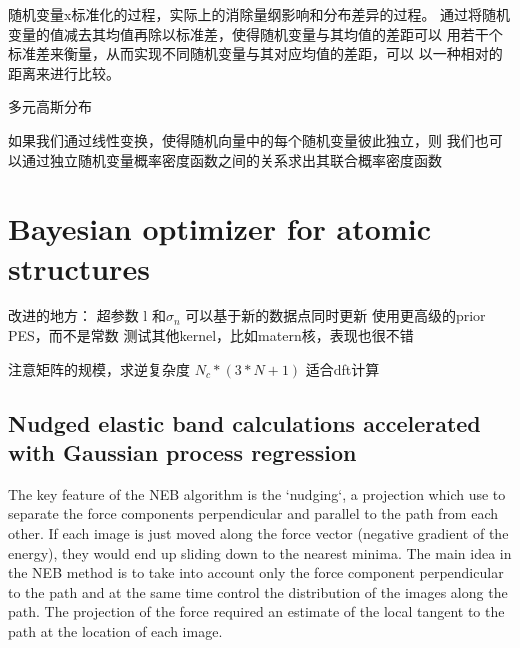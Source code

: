 \documentclass[a4paper, 12pt, CJKnumber, UTF8, openany,nofonts, fancyhdr]{ctexbook}
\begin{document}
 随机变量x标准化的过程，实际上的消除量纲影响和分布差异的过程。
 通过将随机变量的值减去其均值再除以标准差，使得随机变量与其均值的差距可以
 用若干个标准差来衡量，从而实现不同随机变量与其对应均值的差距，可以
 以一种相对的距离来进行比较。

 多元高斯分布

 如果我们通过线性变换，使得随机向量中的每个随机变量彼此独立，则
 我们也可以通过独立随机变量概率密度函数之间的关系求出其联合概率密度函数

 \section{Bayesian optimizer for atomic structures}

 改进的地方：
 超参数 l 和$\sigma_n$ 可以基于新的数据点同时更新
 使用更高级的prior PES，而不是常数
 测试其他kernel，比如matern核，表现也很不错

 注意矩阵的规模，求逆复杂度 $N_c*(3*N+1)$  适合dft计算

 \subsection{Nudged elastic band calculations accelerated with Gaussian
   process regression}

 The key feature of the NEB algorithm is the `nudging`,
 a projection which  use to separate the force components perpendicular
 and parallel to the path from each other. If each image is just moved
 along the force vector (negative gradient of the energy),
 they would end up sliding down to the nearest minima. The main idea in the
 NEB method is to take into account only the force component perpendicular to the path
 and at the same time control the distribution of the images along
 the path.
 The projection of the force required an estimate of the local tangent
 to the path at the location of each image.
\end{document}
